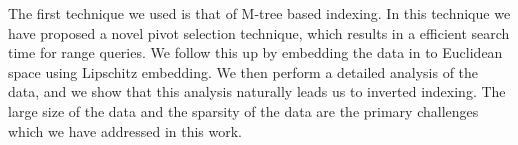 	The first technique we used is that of M-tree \cite{ciaccia1997indexing} based indexing. In this technique we have proposed a novel pivot selection technique, which results in a efficient search time for range queries. We follow this up by embedding the data in to Euclidean space using Lipschitz embedding. We then perform a detailed analysis of the data, and we show that this analysis naturally leads us to inverted indexing. The large size of the data and the sparsity of the data are the primary challenges which we have addressed in this work.\\

